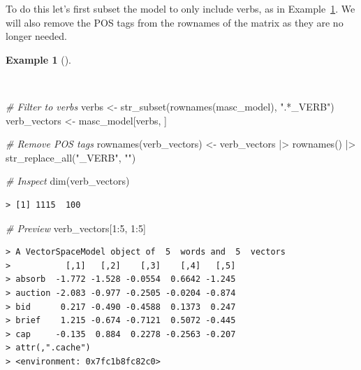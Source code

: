 \documentclass[
  letterpaper,
]{latex/krantz}
\newenvironment{Shaded}{\begin{snugshade}}{\end{snugshade}}
\newcommand{\CommentTok}[1]{\textcolor[rgb]{0.00,0.00,0.00}{\textit{#1}}}
\newcommand{\DecValTok}[1]{\textcolor[rgb]{0.00,0.00,0.00}{#1}}
\newcommand{\FunctionTok}[1]{\textcolor[rgb]{0.00,0.00,0.00}{#1}}
\newcommand{\NormalTok}[1]{\textcolor[rgb]{0.00,0.00,0.00}{#1}}
\newcommand{\OtherTok}[1]{\textcolor[rgb]{0.00,0.00,0.00}{#1}}
\newcommand{\SpecialCharTok}[1]{\textcolor[rgb]{0.00,0.00,0.00}{#1}}
\newcommand{\StringTok}[1]{\textcolor[rgb]{0.00,0.00,0.00}{#1}}
\theoremstyle{definition}
\newtheorem{example}{Example}[chapter]
\theoremstyle{remark}
\begin{document}
To do this let's first subset the model to only include verbs, as in
Example~\ref{exm-eda-masc-vsm-word2vec-verbs}. We will also remove the
POS tags from the rownames of the matrix as they are no longer needed.

\begin{example}[]\protect\hypertarget{exm-eda-masc-vsm-word2vec-verbs}{}\label{exm-eda-masc-vsm-word2vec-verbs}

~

\begin{Shaded}
\begin{Highlighting}[]
\CommentTok{\# Filter to verbs}
\NormalTok{verbs }\OtherTok{\textless{}{-}} \FunctionTok{str\_subset}\NormalTok{(}\FunctionTok{rownames}\NormalTok{(masc\_model), }\StringTok{".*\_VERB"}\NormalTok{)}
\NormalTok{verb\_vectors }\OtherTok{\textless{}{-}}\NormalTok{ masc\_model[verbs, ]}

\CommentTok{\# Remove POS tags}
\FunctionTok{rownames}\NormalTok{(verb\_vectors) }\OtherTok{\textless{}{-}}
\NormalTok{  verb\_vectors }\SpecialCharTok{|\textgreater{}}
  \FunctionTok{rownames}\NormalTok{() }\SpecialCharTok{|\textgreater{}}
  \FunctionTok{str\_replace\_all}\NormalTok{(}\StringTok{"\_VERB"}\NormalTok{, }\StringTok{""}\NormalTok{)}

\CommentTok{\# Inspect}
\FunctionTok{dim}\NormalTok{(verb\_vectors)}
\end{Highlighting}
\end{Shaded}

\begin{verbatim}
> [1] 1115  100
\end{verbatim}

\begin{Shaded}
\begin{Highlighting}[]
\CommentTok{\# Preview}
\NormalTok{verb\_vectors[}\DecValTok{1}\SpecialCharTok{:}\DecValTok{5}\NormalTok{, }\DecValTok{1}\SpecialCharTok{:}\DecValTok{5}\NormalTok{]}
\end{Highlighting}
\end{Shaded}

\begin{verbatim}
> A VectorSpaceModel object of  5  words and  5  vectors
>           [,1]   [,2]    [,3]    [,4]   [,5]
> absorb  -1.772 -1.528 -0.0554  0.6642 -1.245
> auction -2.083 -0.977 -0.2505 -0.0204 -0.874
> bid      0.217 -0.490 -0.4588  0.1373  0.247
> brief    1.215 -0.674 -0.7121  0.5072 -0.445
> cap     -0.135  0.884  0.2278 -0.2563 -0.207
> attr(,".cache")
> <environment: 0x7fc1b8fc82c0>
\end{verbatim}

\end{example}
\end{document}
